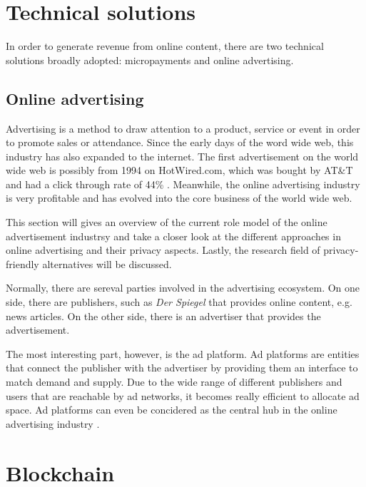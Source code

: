 \section{Technical solutions}

In order to generate revenue from online content, there are two technical solutions broadly adopted: micropayments and online advertising. 

\subsection{Online advertising}
Advertising is a method to draw attention to a product, service or event in order to promote sales or attendance. Since the early days of the word wide web, this industry has also expanded to the internet. The first advertisement on the world wide web is possibly from 1994 on HotWired.com, which was bought by AT\&T and had a click through rate of 44\% \cite{firstbanner}. Meanwhile, the online advertising industry is very profitable and has evolved into the core business of the world wide web.

This section will gives an overview of the current role model of the online advertisement industrsy and take a closer look at the different approaches in online advertising and their privacy aspects. Lastly, the research field of privacy-friendly alternatives will be discussed. 

Normally, there are sereval parties involved in the advertising ecosystem. On one side, there are publishers, such as \textit{Der Spiegel} that provides online content, e.g. news articles. On the other side, there is an advertiser that provides the advertisement.

The most interesting part, however, is the ad platform. Ad platforms are entities that connect the publisher with the advertiser by providing them an interface to match demand and supply. Due to the wide range of different publishers and users that are reachable by ad networks, it becomes really efficient to allocate ad space. Ad platforms can even be concidered as the central hub in the online advertising industry \cite{estrada2017online}.





\section{Blockchain}

